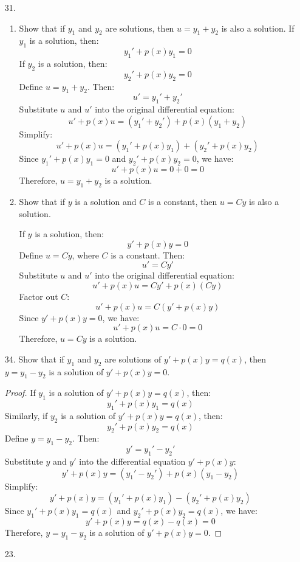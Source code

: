 \documentclass[12pt]{article}
\begin{document}
\begin{enumerate}
\item [31. ]
\begin{enumerate}
    \item Show that if \( y_1 \) and \( y_2 \) are solutions, then \( u = y_1 + y_2 \) is also a solution.
        If \( y_1 \) is a solution, then:
        \[
        y_1' + p(x)y_1 = 0
        \]
        If \( y_2 \) is a solution, then:
        \[
        y_2' + p(x)y_2 = 0
        \]
        Define \( u = y_1 + y_2 \). Then:
        \[
        u' = y_1' + y_2'
        \]
        Substitute \( u \) and \( u' \) into the original differential equation:
        \[
        u' + p(x)u = (y_1' + y_2') + p(x)(y_1 + y_2)
        \]
        Simplify:
        \[
        u' + p(x)u = (y_1' + p(x)y_1) + (y_2' + p(x)y_2)
        \]
        Since \( y_1' + p(x)y_1 = 0 \) and \( y_2' + p(x)y_2 = 0 \), we have:
        \[
        u' + p(x)u = 0 + 0 = 0
        \]
        Therefore, \( u = y_1 + y_2 \) is a solution.

    \item Show that if \( y \) is a solution and \( C \) is a constant, then \( u = Cy \) is also a solution.

        If \( y \) is a solution, then:
        \[
        y' + p(x)y = 0
        \]
        Define \( u = Cy \), where \( C \) is a constant. Then:
        \[
        u' = C y'
        \]
        Substitute \( u \) and \( u' \) into the original differential equation:
        \[
        u' + p(x)u = C y' + p(x)(C y)
        \]
        Factor out \( C \):
        \[
        u' + p(x)u = C (y' + p(x)y)
        \]
        Since \( y' + p(x)y = 0 \), we have:
        \[
        u' + p(x)u = C \cdot 0 = 0
        \]
        Therefore, \( u = Cy \) is a solution.
\end{enumerate}

\item [34. ] Show that if \( y_1 \) and \( y_2 \) are solutions of \( y' + p(x)y = q(x) \), then \( y = y_1 - y_2 \) is a solution of \( y' + p(x)y = 0 \).
    \begin{proof}
        If \( y_1 \) is a solution of \( y' + p(x)y = q(x) \), then:
        \[
        y_1' + p(x)y_1 = q(x)
        \]
        Similarly, if \( y_2 \) is a solution of \( y' + p(x)y = q(x) \), then:
        \[
        y_2' + p(x)y_2 = q(x)
        \]
        Define \( y = y_1 - y_2 \). Then:
        \[
        y' = y_1' - y_2'
        \]
        Substitute \( y \) and \( y' \) into the differential equation \( y' + p(x)y \):
        \[
        y' + p(x)y = (y_1' - y_2') + p(x)(y_1 - y_2)
        \]
        Simplify:
        \[
        y' + p(x)y = (y_1' + p(x)y_1) - (y_2' + p(x)y_2)
        \]
        Since \( y_1' + p(x)y_1 = q(x) \) and \( y_2' + p(x)y_2 = q(x) \), we have:
        \[
        y' + p(x)y = q(x) - q(x) = 0
        \]
        Therefore, \( y = y_1 - y_2 \) is a solution of \( y' + p(x)y = 0 \).
    \end{proof}
\item [23. ] 
\begin{enumerate}


\end{enumerate}
\end{enumerate}
\end{document}
